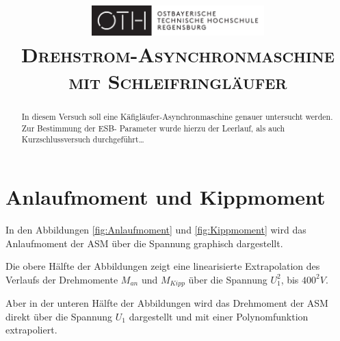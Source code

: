 \documentclass[conference]{IEEEtran}
\begin{document}
\title{
    \centering
    \includegraphics[width=0.5\textwidth]{../OTHR_OTHR_Logo.pdf}\\
    \textsc{Drehstrom-Asynchronmaschine mit Schleifringläufer} \\
}

\maketitle

\begin{abstract}
    In diesem Versuch soll eine Käfigläufer-Asynchronmaschine genauer
    untersucht werden. Zur Bestimmung der ESB- Parameter wurde hierzu der
    Leerlauf, als auch Kurzschlussversuch durchgeführt\dots
\end{abstract}

\section{Anlaufmoment und Kippmoment}

In den Abbildungen \ref{fig:Anlaufmoment} und \ref{fig:Kippmoment} wird das
Anlaufmoment der ASM über die Spannung graphisch dargestellt.

Die obere Hälfte der Abbildungen zeigt eine linearisierte Extrapolation des
Verlaufs der Drehmomente $M_{an}$ und $M_{\textit{Kipp}}$ über die Spannung
$U_1^2$, bis $400^2V$.

Aber in der unteren Hälfte der Abbildungen wird das Drehmoment der ASM direkt
über die Spannung $U_1$ dargestellt und mit einer Polynomfunktion extrapoliert.
\end{document}

